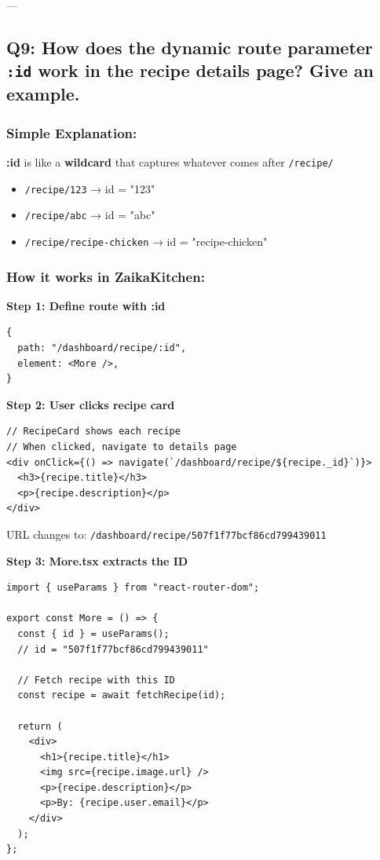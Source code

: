 \documentclass[12pt]{article}
\begin{document}
---

\subsection{Q9: How does the dynamic route parameter \texttt{:id} work in the recipe details page? Give an example.}

\subsubsection*{Simple Explanation:}

\textbf{:id} is like a \textbf{wildcard} that captures whatever comes after \texttt{/recipe/}

\begin{itemize}
    \item \texttt{/recipe/123} → id = "123"
    \item \texttt{/recipe/abc} → id = "abc"
    \item \texttt{/recipe/recipe-chicken} → id = "recipe-chicken"
\end{itemize}

\subsubsection*{How it works in ZaikaKitchen:}

\textbf{Step 1: Define route with :id}

\begin{lstlisting}
{
  path: "/dashboard/recipe/:id",
  element: <More />,
}
\end{lstlisting}

\textbf{Step 2: User clicks recipe card}

\begin{lstlisting}
// RecipeCard shows each recipe
// When clicked, navigate to details page
<div onClick={() => navigate(`/dashboard/recipe/${recipe._id}`)}>
  <h3>{recipe.title}</h3>
  <p>{recipe.description}</p>
</div>
\end{lstlisting}

URL changes to: \texttt{/dashboard/recipe/507f1f77bcf86cd799439011}

\textbf{Step 3: More.tsx extracts the ID}

\begin{lstlisting}
import { useParams } from "react-router-dom";

export const More = () => {
  const { id } = useParams();
  // id = "507f1f77bcf86cd799439011"
  
  // Fetch recipe with this ID
  const recipe = await fetchRecipe(id);
  
  return (
    <div>
      <h1>{recipe.title}</h1>
      <img src={recipe.image.url} />
      <p>{recipe.description}</p>
      <p>By: {recipe.user.email}</p>
    </div>
  );
};
\end{lstlisting}
\end{document}
